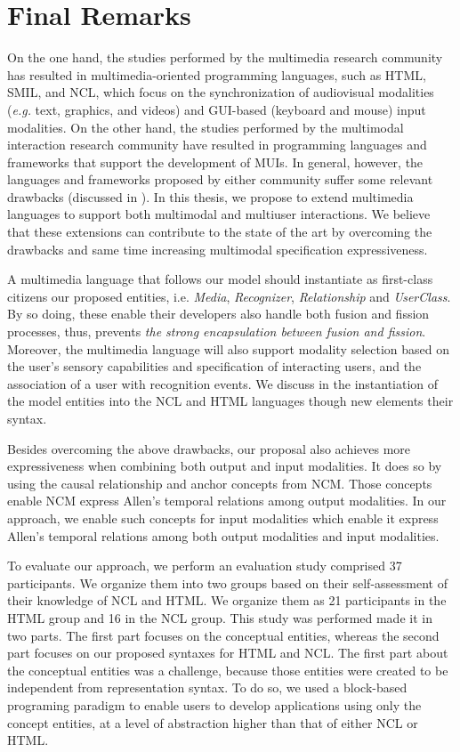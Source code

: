 \chapter{Final Remarks}
\label{chp:final}

On the one hand, the studies performed by the multimedia research community has
resulted in multimedia-oriented programming languages, such as HTML, SMIL, and
NCL, which focus on the synchronization of audiovisual modalities (\textit{e.g.} text,
graphics, and videos) and GUI-based (keyboard and mouse) input modalities. On
the other hand, the studies performed by the multimodal interaction research
community have resulted in programming languages and frameworks that support the
development of MUIs. In general, however, the languages and frameworks proposed
by either community suffer some relevant drawbacks (discussed in
).
In this thesis, we propose to extend multimedia languages to support both
multimodal and multiuser interactions. We believe that these extensions can
contribute to the state of the art by overcoming the drawbacks and same time
increasing multimodal specification expressiveness.

A multimedia language that follows our model should instantiate as first-class
citizens our proposed entities, i.e. \textit{Media}, \textit{Recognizer},
\textit{Relationship} and \textit{UserClass}. By so doing, these enable their
developers also handle both fusion and fission processes, thus,
prevents\textit{ the strong encapsulation between fusion and fission}.
Moreover, the multimedia language will also support modality selection based on
the user’s sensory capabilities and specification of interacting users, and the
association of a user with recognition events. We discuss in
 the instantiation of the model entities into the NCL
and HTML languages though new elements their syntax.

Besides overcoming the above drawbacks, our proposal also achieves more
expressiveness when combining both output and input modalities. It does so by
using the causal relationship and anchor concepts from NCM. Those concepts
enable NCM express Allen’s temporal relations among output modalities. In our
approach, we enable such concepts for input modalities which enable it express
Allen’s temporal relations among both output modalities and input modalities.

To evaluate our approach, we perform an evaluation study comprised 37
participants. We organize them into two groups based on their self-assessment
of their knowledge of NCL and HTML. We organize them as 21 participants in the
HTML group and 16 in the NCL group. This study was performed made it in two
parts. The first part focuses on the conceptual entities, whereas the second
part focuses on our proposed syntaxes for HTML and NCL. The first part about
the conceptual entities was a challenge, because those entities were created to
be independent from representation syntax. To do so, we used a block-based
programing paradigm to enable users to develop applications using only the
concept entities, at a level of abstraction higher than that of either NCL or
HTML.

